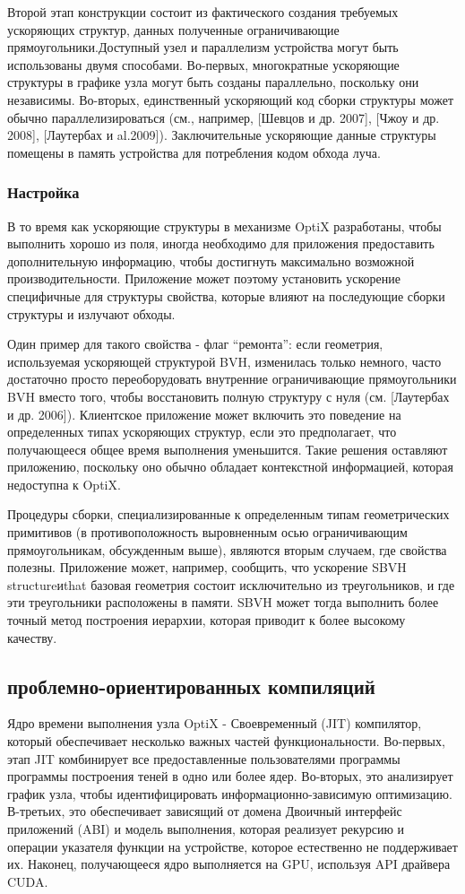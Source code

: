 Второй этап конструкции состоит из фактического создания требуемых ускоряющих структур, данных полученные ограничивающие прямоугольники.Доступный узел и параллелизм устройства могут быть использованы двумя способами. Во-первых, многократные ускоряющие структуры в графике узла могут быть созданы параллельно, поскольку они независимы. Во-вторых, единственный ускоряющий код сборки структуры может обычно параллелизироваться (см., например, [Шевцов и др. 2007], [Чжоу и др. 2008], [Лаутербах и al.2009]). Заключительные ускоряющие данные структуры помещены в память устройства для потребления кодом обхода луча.
\subsubsection{Настройка}
В то время как ускоряющие структуры в механизме OptiX разработаны, чтобы выполнить хорошо из поля, иногда необходимо для приложения предоставить дополнительную информацию, чтобы достигнуть максимально возможной производительности. Приложение может поэтому установить ускорение специфичные для структуры свойства, которые влияют на последующие сборки структуры и излучают обходы.

  Один пример для такого свойства - флаг “ремонта”: если геометрия, используемая ускоряющей структурой BVH, изменилась только немного, часто достаточно просто переоборудовать внутренние ограничивающие прямоугольники BVH вместо того, чтобы восстановить полную структуру с нуля (см. [Лаутербах и др. 2006]). Клиентское приложение может включить это поведение на определенных типах ускоряющих структур, если это предполагает, что получающееся общее время выполнения уменьшится. Такие решения оставляют приложению, поскольку оно обычно обладает контекстной информацией, которая недоступна к OptiX.
  
    Процедуры сборки, специализированные к определенным типам геометрических примитивов (в противоположность выровненным осью ограничивающим прямоугольникам, обсужденным выше), являются вторым случаем, где свойства полезны. Приложение может, например, сообщить, что ускорение SBVH structureиthat базовая геометрия состоит исключительно из треугольников, и где эти треугольники расположены в памяти. SBVH может тогда выполнить более точный метод построения иерархии, которая приводит к более высокому качеству.
    
\subsection{проблемно-ориентированных компиляций}
Ядро времени выполнения узла OptiX - Своевременный (JIT) компилятор, который обеспечивает несколько важных частей функциональности. Во-первых, этап JIT комбинирует все предоставленные пользователями программы программы построения теней в одно или более ядер. Во-вторых, это анализирует график узла, чтобы идентифицировать информационно-зависимую оптимизацию. В-третьих, это обеспечивает зависящий от домена Двоичный интерфейс приложений (ABI) и модель выполнения, которая реализует рекурсию и операции указателя функции на устройстве, которое естественно не поддерживает их. Наконец, получающееся ядро выполняется на GPU, используя API драйвера CUDA.
